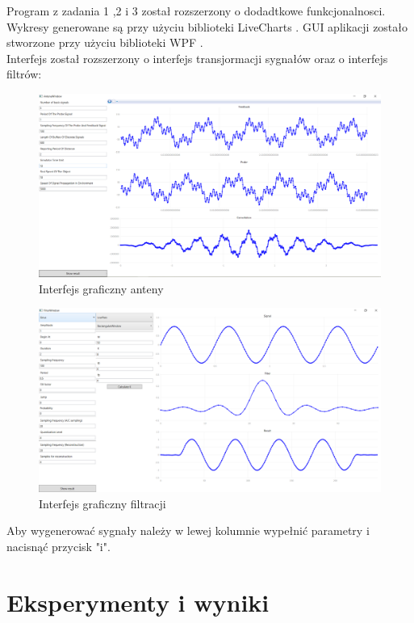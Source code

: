 \documentclass[12pt]{article}
\begin{document}
Program z zadania 1 ,2  i 3 został rozszerzony o dodadtkowe funkcjonalnosci. Wykresy generowane są przy użyciu biblioteki LiveCharts \cite{lv}. GUI aplikacji zostało stworzone przy użyciu biblioteki WPF \cite{wpf}.
\\Interfejs został rozszerzony o interfejs transjormacji sygnałów oraz o interfejs filtrów:
\begin{figure}[H]
 \centering
 \includegraphics[width=15cm]{images/antenaWindow.PNG}
 \vspace{-0.3cm}
 \caption{Interfejs graficzny anteny}
 \label{gui}
\end{figure}
\begin{figure}[H]
 \centering
 \includegraphics[width=15cm]{images/filterWindow.PNG}
 \vspace{-0.3cm}
 \caption{Interfejs graficzny filtracji}
 \label{gui}
\end{figure}


Aby wygenerować sygnały należy w lewej kolumnie wypełnić parametry i nacisnąć przycisk "i". 
\section{Eksperymenty i wyniki}
\end{document}
